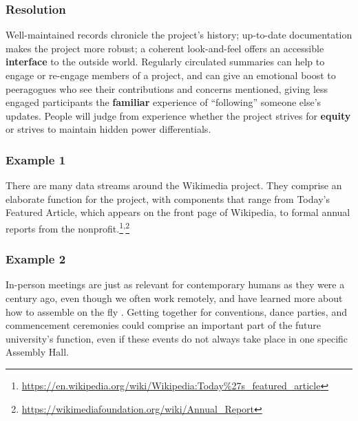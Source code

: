 \subsubsection*{Resolution} 
Well-maintained records chronicle the project's history; up-to-date documentation makes the project more robust; a coherent look-and-feel offers an accessible \textbf{interface} to the outside world. Regularly circulated summaries can help to engage or re-engage members of a project, and can give an emotional boost to peeragogues who see their contributions and concerns mentioned, giving less engaged participants the \textbf{familiar} experience of ``following'' someone else's updates. People will judge from experience whether the project strives for \textbf{equity} or strives to maintain hidden power differentials.  

\subsubsection*{Example 1} 
There are many data streams around the Wikimedia project.  They comprise an elaborate  function for the project, with components that range from Today's Featured Article, which appears on the front page of Wikipedia, to formal annual reports from the nonprofit.\footnote{\url{https://en.wikipedia.org/wiki/Wikipedia:Today\%27s_featured_article}}\textsuperscript{,}\footnote{\url{https://wikimediafoundation.org/wiki/Annual_Report}}


\subsubsection*{Example 2} In-person meetings are just as relevant for contemporary humans as they were a century ago, even though we often work remotely, and have learned more about how to assemble on the fly \cite{rheingold2007smart}.  Getting together for conventions, dance parties, and commencement ceremonies could comprise an important part of the future university's  function, even if these events do not always take place in one specific Assembly Hall.

